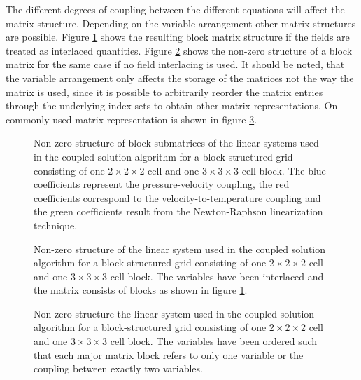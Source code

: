 The different degrees of coupling between the different equations will affect the matrix structure. Depending on the variable arrangement other matrix structures are possible. Figure \ref{fig:cpldassemble} shows the resulting block matrix structure if the fields are treated as interlaced quantities. Figure \ref{fig:interlacemat} shows the non-zero structure of a block matrix for the same case if no field interlacing is used. It should be noted, that the variable arrangement only affects the storage of the matrices not the way the matrix is used, since it is possible to arbitrarily reorder the matrix entries through the underlying index sets to obtain other matrix representations. On commonly used matrix representation is shown in figure \ref{fig:nointerlacemat}.

\begin{figure}
  \centering
  
  \caption{Non-zero structure of block submatrices of the linear systems used in the coupled solution algorithm for a block-structured grid consisting of one $2\times2\times2$ cell and one $3\times3\times3$ cell block. The blue coefficients represent the pressure-velocity coupling, the red coefficients correspond to the velocity-to-temperature coupling and the green coefficients result from the Newton-Raphson linearization technique.}
  \label{fig:cpldassemble}
\end{figure}

\begin{figure}
  \centering
  
  \caption{Non-zero structure of the linear system used in the coupled solution algorithm for a block-structured grid consisting of one $2\times2\times2$ cell and one $3\times3\times3$ cell block. The variables have been interlaced and the matrix consists of blocks as shown in figure \ref{fig:cpldassemble}.}
  \label{fig:interlacemat}
\end{figure}

\begin{figure}
  \centering
   
  \caption{Non-zero structure the linear system used in the coupled solution algorithm for a block-structured grid consisting of one $2\times2\times2$ cell and one $3\times3\times3$ cell block. The variables have been ordered such that each major matrix block refers to only one variable or the coupling between exactly two variables.}
  \label{fig:nointerlacemat}
\end{figure}
